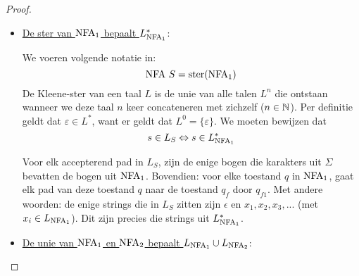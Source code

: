 \documentclass[../aanvullingen_cursus.tex]{subfiles}
\begin{document}
\begin{proof}
\begin{itemize}
		\item \underline{De ster van \( \text{NFA}_1 \) bepaalt \( L_{\text{NFA}_1}^* \)}:

		We voeren volgende notatie in: \[ \text{NFA } S = \operatorname*{ster}(\text{NFA}_{1}) \] De Kleene-ster van een taal \( L \) is de unie van alle talen \(L^n\) die ontstaan wanneer we deze taal \( n \) keer concateneren met zichzelf (\(n \in \mathbb{N}\)). Per definitie geldt dat \(\varepsilon \in L^*\), want er geldt dat \( L^0=\{\varepsilon\} \). We moeten bewijzen dat \[ s \in L_{S} \Leftrightarrow s \in L_{\text{NFA}_1}^* \]

		Voor elk accepterend pad in \( L_S \), zijn de enige bogen die karakters uit \( \Sigma \) bevatten de bogen uit \(\text{NFA}_1\). Bovendien: voor elke toestand \(q\) in \(\text{NFA}_1\), gaat elk pad van deze toestand \(q\) naar de toestand \(q_f\) door \(q_{f1}\). Met andere woorden: de enige strings die in \(L_S\) zitten zijn \( \epsilon \) en \( x_1, x_2,x_3, ...\) (met \(x_i \in L_{\text{NFA}_1} \)). Dit zijn precies die strings uit \( L_{\text{NFA}_1}^* \).

		\item \underline{De unie van \( \text{NFA}_1 \) en \( \text{NFA}_2 \) bepaalt \( L_{\text{NFA}_1} \cup L_{\text{NFA}_2} \)}:


\end{itemize}
\end{proof}
\end{document}
